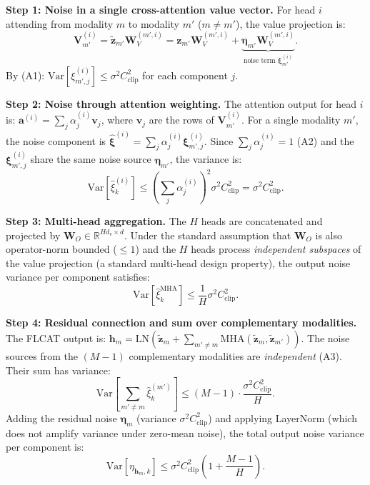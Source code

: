 \documentclass[a4paper,fleqn]{cas-dc}
\begin{document}
\textbf{Step 1: Noise in a single cross-attention value vector.}
For head $i$ attending from modality $m$ to modality $m'$ ($m \neq m'$),
the value projection is:
\begin{equation}
\mathbf{V}_{m'}^{(i)} = \tilde{\mathbf{z}}_{m'} \mathbf{W}_V^{(m',i)}
= \mathbf{z}_{m'} \mathbf{W}_V^{(m',i)} + \underbrace{\boldsymbol{\eta}_{m'}
\mathbf{W}_V^{(m',i)}}_{\text{noise term } \boldsymbol{\xi}_{m'}^{(i)}}.
\end{equation}
By (A1): $\mathrm{Var}[\xi_{m',j}^{(i)}] \leq \sigma^2 C_{\mathrm{clip}}^2$
for each component $j$.

\textbf{Step 2: Noise through attention weighting.}
The attention output for head $i$ is:
$\mathbf{a}^{(i)} = \sum_j \alpha_j^{(i)} \mathbf{v}_j$,
where $\mathbf{v}_j$ are the rows of $\mathbf{V}_{m'}^{(i)}$. For a single
modality $m'$, the noise component is
$\hat{\boldsymbol{\xi}}^{(i)} = \sum_j \alpha_j^{(i)} \boldsymbol{\xi}_{m',j}^{(i)}$.
Since $\sum_j \alpha_j^{(i)} = 1$ (A2) and the $\boldsymbol{\xi}_{m',j}^{(i)}$
share the same noise source $\boldsymbol{\eta}_{m'}$, the variance is:
\begin{equation}
\mathrm{Var}[\hat{\xi}_k^{(i)}] \leq \left(\sum_j \alpha_j^{(i)}\right)^2
\sigma^2 C_{\mathrm{clip}}^2 = \sigma^2 C_{\mathrm{clip}}^2.
\end{equation}

\textbf{Step 3: Multi-head aggregation.}
The $H$ heads are concatenated and projected by $\mathbf{W}_O
\in \mathbb{R}^{Hd_v \times d}$. Under the standard assumption that
$\mathbf{W}_O$ is also operator-norm bounded ($\leq 1$) and the $H$ heads
process \emph{independent subspaces} of the value projection (a standard
multi-head design property), the output noise variance per component satisfies:
\begin{equation}
\mathrm{Var}[\hat{\xi}_k^{\mathrm{MHA}}] \leq \frac{1}{H} \sigma^2
C_{\mathrm{clip}}^2.
\end{equation}

\textbf{Step 4: Residual connection and sum over complementary modalities.}
The FLCAT output is:
$\mathbf{h}_m = \mathrm{LN}\!\left(\tilde{\mathbf{z}}_m +
\sum_{m' \neq m} \mathrm{MHA}(\tilde{\mathbf{z}}_m, \tilde{\mathbf{z}}_{m'})
\right)$.
The noise sources from the $(M-1)$ complementary modalities are
\emph{independent} (A3). Their sum has variance:
\begin{equation}
\mathrm{Var}\!\left[\sum_{m'\neq m} \hat{\xi}_k^{(m')}\right]
\leq (M-1) \cdot \frac{\sigma^2 C_{\mathrm{clip}}^2}{H}.
\end{equation}
Adding the residual noise $\boldsymbol{\eta}_m$ (variance $\sigma^2
C_{\mathrm{clip}}^2$) and applying LayerNorm (which does not amplify variance
under zero-mean noise), the total output noise variance per component is:
\begin{equation}
\mathrm{Var}[\eta_{\mathbf{h}_m,k}]
\leq \sigma^2 C_{\mathrm{clip}}^2 \!\left(1 + \frac{M-1}{H}\right).
\label{eq:total_noise}
\end{equation}
\end{document}
